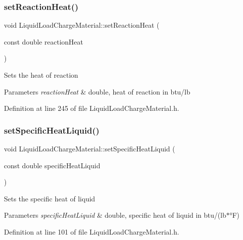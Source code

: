 \subsubsection{\texorpdfstring{set\+Reaction\+Heat()}{setReactionHeat()}}
{\footnotesize\ttfamily void Liquid\+Load\+Charge\+Material\+::set\+Reaction\+Heat (\begin{DoxyParamCaption}\item[{const double}]{reaction\+Heat }\end{DoxyParamCaption})\hspace{0.3cm}{\ttfamily [inline]}}

Sets the heat of reaction 
\begin{DoxyParams}{Parameters}
{\em reaction\+Heat} & double, heat of reaction in btu/lb \\
\hline
\end{DoxyParams}


Definition at line 245 of file Liquid\+Load\+Charge\+Material.\+h.

\mbox{\label{class_liquid_load_charge_material_a2187c4c6ba394c05ab42e769bf175683}} 
\subsubsection{\texorpdfstring{set\+Specific\+Heat\+Liquid()}{setSpecificHeatLiquid()}}
{\footnotesize\ttfamily void Liquid\+Load\+Charge\+Material\+::set\+Specific\+Heat\+Liquid (\begin{DoxyParamCaption}\item[{const double}]{specific\+Heat\+Liquid }\end{DoxyParamCaption})\hspace{0.3cm}{\ttfamily [inline]}}

Sets the specific heat of liquid 
\begin{DoxyParams}{Parameters}
{\em specific\+Heat\+Liquid} & double, specific heat of liquid in btu/(lb$\ast$°F) \\
\hline
\end{DoxyParams}


Definition at line 101 of file Liquid\+Load\+Charge\+Material.\+h.

\mbox{\label{class_liquid_load_charge_material_ae95faf01cf6293ab282b1b7fe3b849e1}} 
